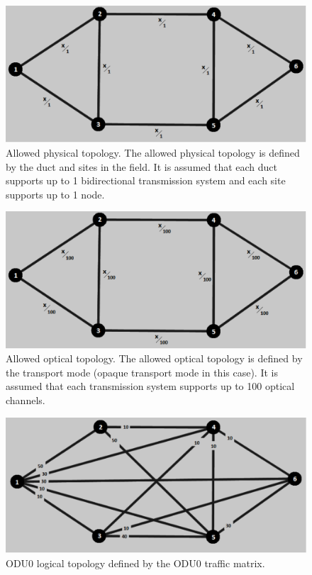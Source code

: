 \begin{figure}[H]
\centering
\includegraphics[width=13cm]{sdf/heuristic/opaque_protection/figures/allowed_physical}
\caption{Allowed physical topology. The allowed physical topology is defined by the duct and sites in the field. It is assumed that each duct supports up to 1 bidirectional transmission system and each site supports up to 1 node.}
\label{allowed_physical_protec_ref_medium_heuristic}
\end{figure}

\begin{figure}[H]
\centering
\includegraphics[width=13cm]{sdf/heuristic/opaque_protection/figures/allowed_optical}
\caption{Allowed optical topology. The allowed optical topology is defined by the transport mode (opaque transport mode in this case). It is assumed that each transmission system supports up to 100 optical channels.}
\label{allowed_optical_protec_ref_medium_heuristic}
\end{figure}

\begin{figure}[H]
\centering
\includegraphics[width=13cm]{sdf/heuristic/opaque_protection/figures/logical_topology_odu0_medium}
\caption{ODU0 logical topology defined by the ODU0 traffic matrix.}
\label{logical_ODU0_protec_ref_medium_heuristic}
\end{figure}

